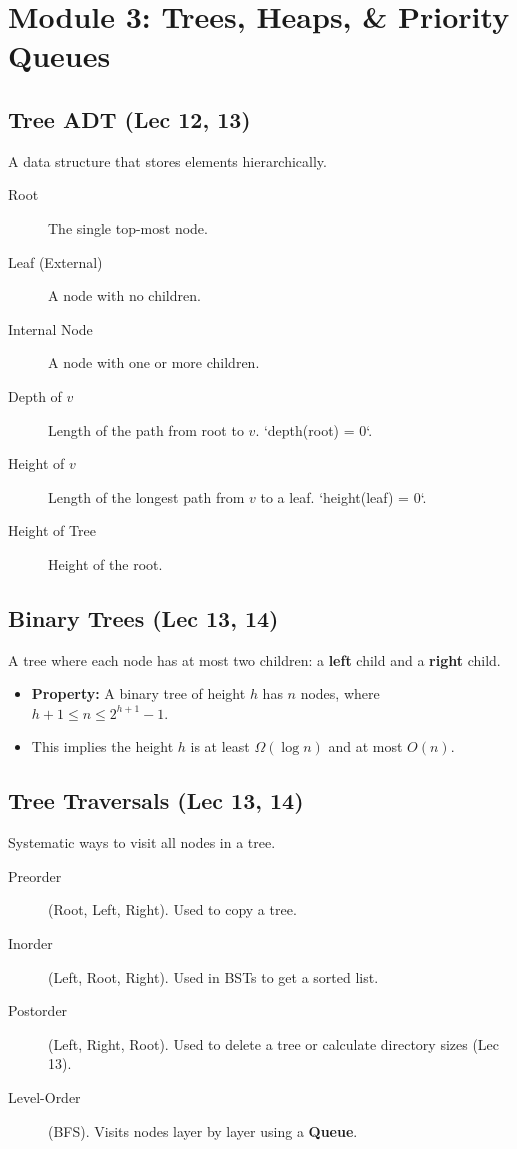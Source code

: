 
\section{Module 3: Trees, Heaps, \& Priority Queues}

\subsection{Tree ADT (Lec 12, 13)}
A data structure that stores elements hierarchically.
\begin{description}
    \item[Root] The single top-most node.
    \item[Leaf (External)] A node with no children.
    \item[Internal Node] A node with one or more children.
    \item[Depth of $v$] Length of the path from root to $v$. `depth(root) = 0`.
    \item[Height of $v$] Length of the longest path from $v$ to a leaf. `height(leaf) = 0`.
    \item[Height of Tree] Height of the root.
\end{description}

\subsection{Binary Trees (Lec 13, 14)}
A tree where each node has at most two children: a \textbf{left} child and a \textbf{right} child.
\begin{itemize}
    \item \textbf{Property:} A binary tree of height $h$ has $n$ nodes, where
    $h+1 \le n \le 2^{h+1} - 1$.
    \item This implies the height $h$ is at least $\Omega(\log n)$ and at most $O(n)$.
\end{itemize}

\subsection{Tree Traversals (Lec 13, 14)}
Systematic ways to visit all nodes in a tree.
\begin{description}
    \item[Preorder] (Root, Left, Right). Used to copy a tree.
    \item[Inorder] (Left, Root, Right). Used in BSTs to get a sorted list.
    \item[Postorder] (Left, Right, Root). Used to delete a tree or calculate directory sizes (Lec 13).
    \item[Level-Order] (BFS). Visits nodes layer by layer using a \textbf{Queue}.
\end{description}


